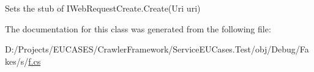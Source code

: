 Sets the stub of I\-Web\-Request\-Create.\-Create(\-Uri uri)



The documentation for this class was generated from the following file\-:\begin{DoxyCompactItemize}
\item 
D\-:/\-Projects/\-E\-U\-C\-A\-S\-E\-S/\-Crawler\-Framework/\-Service\-E\-U\-Cases.\-Test/obj/\-Debug/\-Fakes/s/\hyperlink{s_2f_8cs}{f.\-cs}\end{DoxyCompactItemize}

